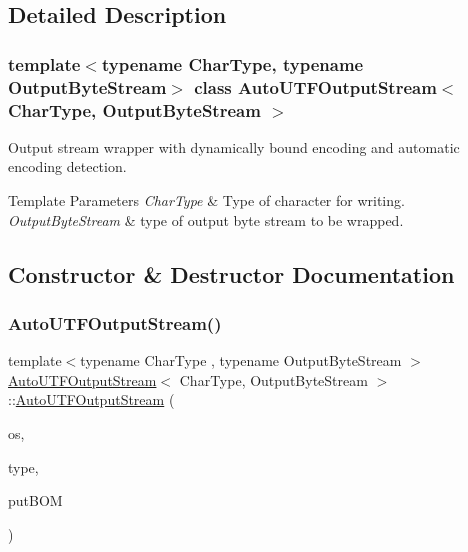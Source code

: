 \subsection{Detailed Description}
\subsubsection*{template$<$typename Char\+Type, typename Output\+Byte\+Stream$>$\newline
class Auto\+U\+T\+F\+Output\+Stream$<$ Char\+Type, Output\+Byte\+Stream $>$}

Output stream wrapper with dynamically bound encoding and automatic encoding detection. 


\begin{DoxyTemplParams}{Template Parameters}
{\em Char\+Type} & Type of character for writing. \\
\hline
{\em Output\+Byte\+Stream} & type of output byte stream to be wrapped. \\
\hline
\end{DoxyTemplParams}


\subsection{Constructor \& Destructor Documentation}
\mbox{\label{class_auto_u_t_f_output_stream_a2fe7dbc8e43d11295f66df5653148137}} 
\subsubsection{\texorpdfstring{Auto\+U\+T\+F\+Output\+Stream()}{AutoUTFOutputStream()}}
{\footnotesize\ttfamily template$<$typename Char\+Type , typename Output\+Byte\+Stream $>$ \\
\hyperlink{class_auto_u_t_f_output_stream}{Auto\+U\+T\+F\+Output\+Stream}$<$ Char\+Type, Output\+Byte\+Stream $>$\+::\hyperlink{class_auto_u_t_f_output_stream}{Auto\+U\+T\+F\+Output\+Stream} (\begin{DoxyParamCaption}\item[{Output\+Byte\+Stream \&}]{os,  }\item[{U\+T\+F\+Type}]{type,  }\item[{bool}]{put\+B\+OM }\end{DoxyParamCaption})\hspace{0.3cm}{\ttfamily [inline]}}



